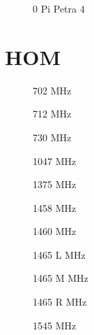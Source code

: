 \begin{figure}[h]
  \centering
  
  \caption{0 Pi Petra 4}
\end{figure}
\FloatBarrier

\section{HOM}
\label{app:hom_felder}
\FloatBarrier

\begin{figure}[h]
  \centering
  
  \caption{702 MHz}
\end{figure}

\begin{figure}[h]
  \centering
  
  \caption{712 MHz}
\end{figure}

\begin{figure}[h]
  \centering
  
  \caption{730 MHz}
\end{figure}

\begin{figure}[h]
  \centering
  
  \caption{1047 MHz}
\end{figure}

\begin{figure}[h]
  \centering
  
  \caption{1375 MHz}
\end{figure}

\begin{figure}[h]
  \centering
  
  \caption{1458 MHz}
\end{figure}

\begin{figure}[h]
  \centering
  
  \caption{1460 MHz}
\end{figure}

\begin{figure}[h]
  \centering
  
  \caption{1465 L MHz}
\end{figure}

\begin{figure}[h]
  \centering
  
  \caption{1465 M MHz}
\end{figure}

\begin{figure}[h]
  \centering
  
  \caption{1465 R MHz}
\end{figure}



\begin{figure}[h]
  \centering
  
  \caption{1545 MHz}
\end{figure}

\FloatBarrier